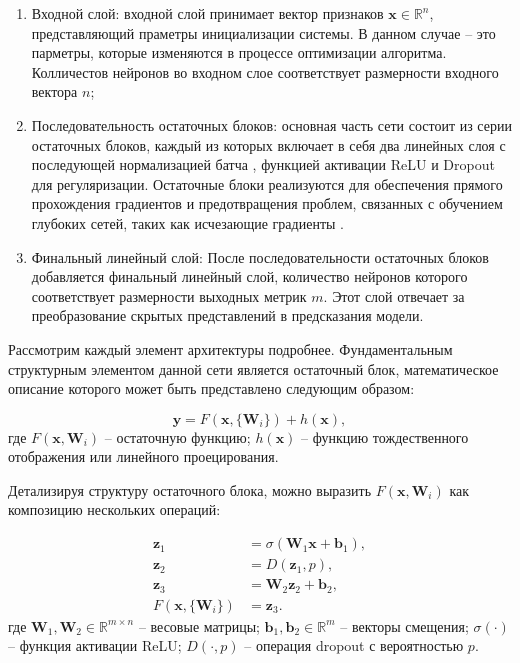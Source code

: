 \begin{enumerate}
    \item Входной слой: входной слой принимает вектор признаков $\mathbf{x} \in \mathbb{R}^n$,
          представляющий праметры инициализации системы. В данном случае -- это парметры,
          которые изменяются в процессе оптимизации алгоритма. Колличестов нейронов во входном
          слое соответствует размерности входного вектора $n$;

    \item Последовательность остаточных блоков: основная часть сети состоит из серии остаточных блоков,
          каждый из которых включает в себя два линейных слоя с последующей нормализацией батча \cite*{ioffe2015batch},
          функцией активации ReLU и Dropout для регуляризации. Остаточные блоки
          реализуются для обеспечения прямого прохождения градиентов и предотвращения
          проблем, связанных с обучением глубоких сетей, таких как исчезающие градиенты \cite*{he2016deep}.

    \item Финальный линейный слой: После последовательности остаточных блоков добавляется финальный линейный слой,
          количество нейронов которого соответствует размерности выходных метрик $m$.
          Этот слой отвечает за преобразование скрытых представлений в предсказания модели.
\end{enumerate}

Рассмотрим каждый элемент архитектуры подробнее.
Фундаментальным структурным элементом данной сети является остаточный блок,
математическое описание которого может быть представлено следующим образом:

\begin{equation*}
    \mathbf{y} = F(\mathbf{x}, \{\mathbf{W}_i\}) + h(\mathbf{x}),
\end{equation*}
где $F(\mathbf{x}, {\mathbf{W}_i})$ -- остаточную функцию;
$h(\mathbf{x})$ -- функцию тождественного отображения или линейного проецирования.

Детализируя структуру остаточного блока,
можно выразить $F(\mathbf{x}, {\mathbf{W}_i})$ как композицию нескольких операций:

\begin{equation*}
    \begin{split}
        \mathbf{z}_1                    & = \sigma(\mathbf{W}_1\mathbf{x} + \mathbf{b}_1), \\
        \mathbf{z}_2                    & = D(\mathbf{z}_1, p),                            \\
        \mathbf{z}_3                    & = \mathbf{W}_2\mathbf{z}_2 + \mathbf{b}_2,       \\
        F(\mathbf{x}, \{\mathbf{W}_i\}) & = \mathbf{z}_3.
    \end{split}
\end{equation*}
где $\mathbf{W}_1, \mathbf{W}_2 \in \mathbb{R}^{m \times n}$ -- весовые матрицы;
$\mathbf{b}_1, \mathbf{b}_2 \in \mathbb{R}^m$ -- векторы смещения;
$\sigma(\cdot)$ -- функция активации ReLU;
$D(\cdot, p)$ -- операция dropout с вероятностью $p$.

